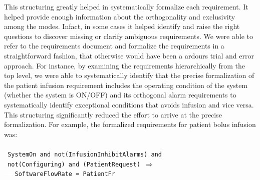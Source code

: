 This structuring greatly helped in systematically formalize each requirement. It helped provide enough information about the orthogonality and exclusivity among the modes. Infact, in some cases it helped identify and raise the right questions to discover missing or clarify ambiguous requirements. We were able to refer to the requirements document and formalize the requirements in a straightforward fashion, that otherwise would have been a ardours trial and error approach. For instance, by examining the requirements hierarchically from the top level, we were able to systematically identify that the precise formalization of the patient infusion requirement includes the operating condition of the system (whether the system is ON/OFF) and its orthogonal alarm requirements to systematically identify exceptional conditions that avoids infusion and vice versa. This structuring significantly reduced the effort to arrive at the precise formalization. %
For example, the formalized requirements for patient bolus infusion was:
\\\\
\footnotesize{\texttt{
SystemOn~and~not(InfusionInhibitAlarms) and \\ \textcolor{white}{---}not(Configuring)~and~(PatientRequest)~$\Rightarrow$ \\
\textcolor{white}{--------}SoftwareFlowRate~=~PatientFr}}
\\\normalsize{}\\

